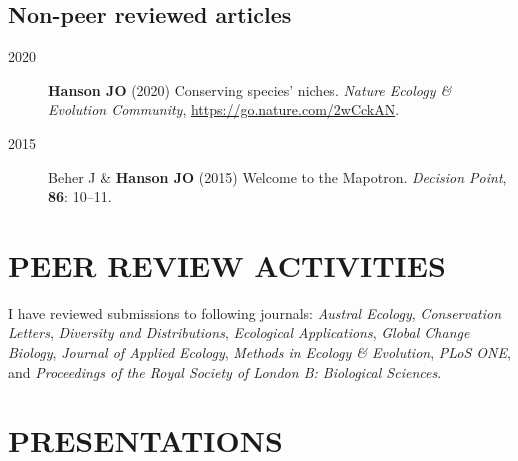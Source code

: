 \documentclass[12pt,a4paper]{article}
\begin{document}
\subsection*{Non-peer reviewed articles}
\begin{description}

\item[2020] \textbf{Hanson JO} (2020) Conserving species' niches. \textit{Nature Ecology \& Evolution Community}, \url{https://go.nature.com/2wCckAN}.

\item[2015] Beher J \& \textbf{Hanson JO} (2015) Welcome to the Mapotron. \textit{Decision Point}, \textbf{86}: 10--11.

\end{description}

\section*{PEER REVIEW ACTIVITIES}

I have reviewed submissions to following journals: \textit{Austral Ecology}, \textit{Conservation Letters}, \textit{Diversity and Distributions}, \textit{Ecological Applications}, \textit{Global Change Biology}, \textit{Journal of Applied Ecology}, \textit{Methods in Ecology \& Evolution}, \textit{PLoS ONE}, and \textit{Proceedings of the Royal Society of London B: Biological Sciences}.

\section*{PRESENTATIONS}
\end{document}
